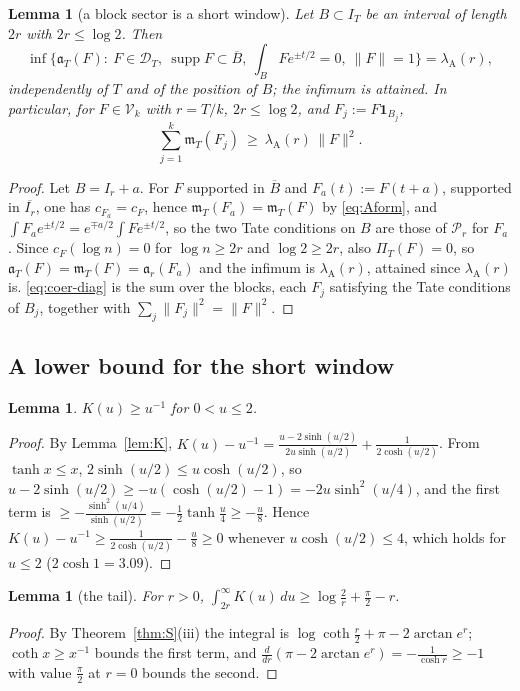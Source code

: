 \documentclass[10pt]{amsart}
\newtheorem{lemma}[theorem]{Lemma}
\theoremstyle{definition}
\theoremstyle{remark}
\newcommand{\supp}{\operatorname{supp}}
\newcommand{\IT}{I_T}
\newcommand{\cF}{c_F}
\newcommand{\PiT}{\Pi_T}
\newcommand{\mT}{\mathfrak m_T}
\begin{document}
\begin{lemma}[a block sector is a short window]\label{lem:coer-sector}
Let $B\subset\IT$ be an interval of length $2r$ with $2r\le\log2$. Then
\[
\inf\Big\{\mathfrak a_T(F):\ F\in\mathcal D_T,\ \supp F\subset\overline B,\ \int_BFe^{\pm t/2}=0,\ \|F\|=1\Big\}=\lambda_{\mathrm A}(r),
\]
independently of $T$ and of the position of $B$; the infimum is attained. In particular, for $F\in\mathcal V_k$ with
$r=T/k$, $2r\le\log2$, and $F_j:=F\mathbf 1_{B_j}$,
\begin{equation}\label{eq:coer-diag}
\sum_{j=1}^k\mT(F_j)\ \ge\ \lambda_{\mathrm A}(r)\,\|F\|^2 .
\end{equation}
\end{lemma}
\begin{proof}
Let $B=I_r+a$. For $F$ supported in $\overline B$ and $F_a(t):=F(t+a)$, supported in $\overline{I_r}$, one has $c_{F_a}=\cF$,
hence $\mT(F_a)=\mT(F)$ by \eqref{eq:Aform}, and $\int F_ae^{\pm t/2}=e^{\mp a/2}\int Fe^{\pm t/2}$, so the two Tate
conditions on $B$ are those of $\mathcal P_r$ for $F_a$. Since $\cF(\log n)=0$ for $\log n\ge2r$ and $\log2\ge2r$, also
$\PiT(F)=0$, so $\mathfrak a_T(F)=\mT(F)=\mathfrak a_r(F_a)$ and the infimum is $\lambda_{\mathrm A}(r)$, attained since
$\lambda_{\mathrm A}(r)$ is. \eqref{eq:coer-diag} is the sum over the blocks, each $F_j$ satisfying the Tate conditions of
$B_j$, together with $\sum_j\|F_j\|^2=\|F\|^2$.
\end{proof}


\subsection{A lower bound for the short window}\label{subsec:coer-short}

\begin{lemma}\label{lem:coer-K}
$K(u)\ge u^{-1}$ for $0<u\le2$.
\end{lemma}
\begin{proof}
By Lemma~\ref{lem:K}, $K(u)-u^{-1}=\frac{u-2\sinh(u/2)}{2u\sinh(u/2)}+\frac1{2\cosh(u/2)}$. From $\tanh x\le x$,
$2\sinh(u/2)\le u\cosh(u/2)$, so $u-2\sinh(u/2)\ge-u(\cosh(u/2)-1)=-2u\sinh^2(u/4)$, and the first term is
$\ge-\frac{\sinh^2(u/4)}{\sinh(u/2)}=-\frac12\tanh\frac u4\ge-\frac u8$. Hence $K(u)-u^{-1}\ge\frac1{2\cosh(u/2)}-\frac u8\ge0$
whenever $u\cosh(u/2)\le4$, which holds for $u\le2$ ($2\cosh1=3.09$).
\end{proof}

\begin{lemma}[the tail]\label{lem:coer-tail}
For $r>0$, $\int_{2r}^\infty K(u)\,du\ge\log\frac2r+\frac\pi2-r$.
\end{lemma}
\begin{proof}
By Theorem~\ref{thm:S}(iii) the integral is $\log\coth\frac r2+\pi-2\arctan e^r$; $\coth x\ge x^{-1}$ bounds the first
term, and $\frac{d}{dr}(\pi-2\arctan e^r)=-\frac1{\cosh r}\ge-1$ with value $\frac\pi2$ at $r=0$ bounds the second.
\end{proof}
\end{document}
